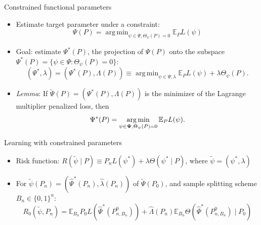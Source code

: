 \documentclass[12pt,t]{beamer}
\newcommand{\E}{\mathbb{E}}
\DeclareMathOperator*{\argmin}{arg\,min}
\begin{document}

\begin{frame}[c]{Constrained functional parameters}

\begin{center}
\begin{itemize}
  \itemsep12pt
  \item Estimate target parameter under a constraint:
    $$\Psi(P) = \argmin_{\psi \in \Psi, \Theta_{\psi}(P) = 0} \E_PL(\psi)$$
  \item Goal: estimate $\Psi^*(P)$, the projection of $\Psi(P)$ onto the
    subspace $\Psi^*(P) = \{\psi \in \Psi: \Theta_{\psi}(P) = 0\}$:
    $$(\Psi^*, \lambda) = (\Psi^*(P), \Lambda(P)) \equiv \argmin_{\psi \in \Psi,
      \lambda} \E_PL(\psi) + \lambda \Theta_{\psi}(P).$$
  \item \textit{Lemma}: If $\widetilde{\Psi}(P) = (\Psi^*(P), \Lambda(P))$ is
    the minimizer of the Lagrange multiplier penalized loss, then
    $$\Psi^*(P) = \argmin_{\psi \in {\bf \Psi}, \Theta_{\psi}(P) = 0}
      \E_{P}L(\psi).$$
\end{itemize}
\end{center}

\note{
}

\end{frame}


\begin{frame}[c]{Learning with constrained parameters}

\begin{center}
\begin{itemize}
  \itemsep14pt
  \item Risk function: $R(\widetilde{\psi} \mid P) \equiv P_nL(\psi^*) +
    \lambda \Theta(\psi^* \mid P)$, where $\widetilde{\psi} = (\psi^*,
    \lambda)$
  \item For $\widetilde{\psi}(P_n) = (\hat{\Psi}^*(P_n), \hat{\lambda}(P_n))$ of
    $\widetilde{\Psi}(P_0)$, and sample splitting scheme $B_n \in \{0, 1\}^n$:
    $$R_0(\widetilde{\psi}, P_n) = \E_{B_n} P_0L(\hat{\Psi}^*(P_{n, B_n}^0)) +
      \hat{\Lambda}(P_n) \E_{B_n} \Theta(\hat{\Psi}^*(P_{n, B_n}^0) \mid P_0)$$
\end{itemize}
\end{center}


\end{frame}
\end{document}
